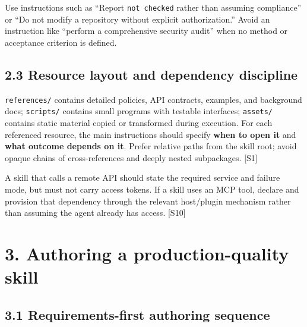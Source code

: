 \documentclass[
  10pt,
  letterpaper,
]{article}
\newcommand{\passthrough}[1]{#1}
\begin{document}
Use instructions such as ``Report \passthrough{\lstinline!not checked!}
rather than assuming compliance'' or ``Do not modify a repository
without explicit authorization.'' Avoid an instruction like ``perform a
comprehensive security audit'' when no method or acceptance criterion is
defined.

\subsection{2.3 Resource layout and dependency
discipline}\label{resource-layout-and-dependency-discipline}

\passthrough{\lstinline!references/!} contains detailed policies, API
contracts, examples, and background docs;
\passthrough{\lstinline!scripts/!} contains small programs with testable
interfaces; \passthrough{\lstinline!assets/!} contains static material
copied or transformed during execution. For each referenced resource,
the main instructions should specify \textbf{when to open it} and
\textbf{what outcome depends on it}. Prefer relative paths from the
skill root; avoid opaque chains of cross-references and deeply nested
subpackages. {[}S1{]}

A skill that calls a remote API should state the required service and
failure mode, but must not carry access tokens. If a skill uses an MCP
tool, declare and provision that dependency through the relevant
host/plugin mechanism rather than assuming the agent already has access.
{[}S10{]}

\section{3. Authoring a production-quality
skill}\label{authoring-a-production-quality-skill}

\subsection{3.1 Requirements-first authoring
sequence}\label{requirements-first-authoring-sequence}
\end{document}
